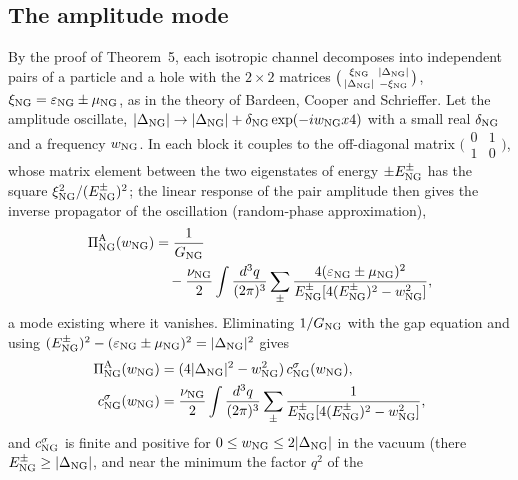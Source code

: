 \subsection{The amplitude mode}

By the proof of Theorem~5, each isotropic channel decomposes into independent pairs of a particle and a
hole with the $2\times2$ matrices $\big(\begin{smallmatrix}\xi_{\rm NG}&\lvert\Delta_{\rm NG}\rvert\\
\lvert\Delta_{\rm NG}\rvert&-\xi_{\rm NG}\end{smallmatrix}\big)$, $\xi_{\rm NG}=\varepsilon_{\rm NG}\pm
\mu_{\rm NG}$, as in the theory of Bardeen, Cooper and Schrieffer. Let the amplitude oscillate,
$\lvert\Delta_{\rm NG}\rvert\to\lvert\Delta_{\rm NG}\rvert+\delta_{\rm NG}\exp(-iw_{\rm NG}x4)$ with a small real
$\delta_{\rm NG}$ and a frequency $w_{\rm NG}$. In each block it couples to the off-diagonal matrix
$\big(\begin{smallmatrix}0&1\\1&0\end{smallmatrix}\big)$, whose matrix element between the two eigenstates
of energy $\pm E^\pm_{\rm NG}$ has the square $\xi_{\rm NG}^2/(E^\pm_{\rm NG})^2$; the linear response of
the pair amplitude then gives the inverse propagator of the oscillation (random-phase approximation),
\begin{align}
\Pi^{\rm A}_{\rm NG}(w_{\rm NG})&=\frac1{G_{\rm NG}}\nonumber\\
&\quad-\frac{\nu_{\rm NG}}2\int\frac{d^3q}{(2\pi)^3}\sum_\pm
\frac{4(\varepsilon_{\rm NG}\pm\mu_{\rm NG})^2}{E^\pm_{\rm NG}[4(E^\pm_{\rm NG})^2-w_{\rm NG}^2]},
\label{eq:pia}
\end{align}
a mode existing where it vanishes. Eliminating $1/G_{\rm NG}$ with the gap equation and using
$(E^\pm_{\rm NG})^2-(\varepsilon_{\rm NG}\pm\mu_{\rm NG})^2=\lvert\Delta_{\rm NG}\rvert^2$ gives
\begin{align}
\Pi^{\rm A}_{\rm NG}(w_{\rm NG})&=(4\lvert\Delta_{\rm NG}\rvert^2-w_{\rm NG}^2)\,c^\sigma_{\rm NG}(w_{\rm NG}),\nonumber\\
c^\sigma_{\rm NG}(w_{\rm NG})&=\frac{\nu_{\rm NG}}2\int\frac{d^3q}{(2\pi)^3}\sum_\pm\frac1{E^\pm_{\rm NG}
[4(E^\pm_{\rm NG})^2-w_{\rm NG}^2]},
\label{eq:csigma}
\end{align}
and $c^\sigma_{\rm NG}$ is finite and positive for $0\le w_{\rm NG}\le2\lvert\Delta_{\rm NG}\rvert$ in the
vacuum (there $E^\pm_{\rm NG}\ge\lvert\Delta_{\rm NG}\rvert$, and near the minimum the factor $q^2$ of the
